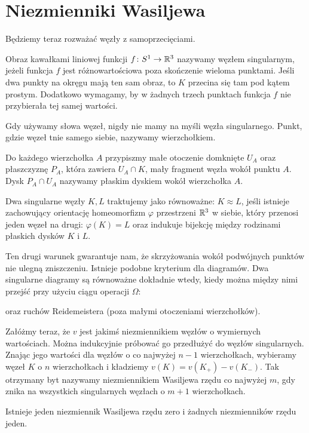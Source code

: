 \section{Niezmienniki Wasiljewa} %
\label{sec:vassiliev}
Będziemy teraz rozważać węzły z samoprzecięciami.

\begin{definition}
	Obraz kawałkami liniowej funkcji $f \colon S^1 \to \mathbb R^3$ nazywamy węzłem singularnym, jeżeli funkcja $f$ jest różnowartościowa poza skończenie wieloma punktami.
	Jeśli dwa punkty na okręgu mają ten sam obraz, to $K$ przecina się tam pod kątem prostym.
	Dodatkowo wymagamy, by w żadnych trzech punktach funkcja $f$ nie przybierała tej samej wartości.
\end{definition}

Gdy używamy słowa węzeł, nigdy nie mamy na myśli węzła singularnego.
Punkt, gdzie węzeł tnie samego siebie, nazywamy wierzchołkiem.

Do każdego wierzchołka $A$ przypiszmy małe otoczenie domknięte $U_A$ oraz płaszczyznę $P_A$, która zawiera $U_A \cap K$, mały fragment węzła wokół punktu $A$. Dysk $P_A \cap U_A$ nazywamy płaskim dyskiem wokół wierzchołka $A$.

\begin{definition}
	Dwa singularne węzły $K, L$ traktujemy jako równoważne: $K \approx L$, jeśli istnieje zachowujący orientację homeomorfizm $\varphi$ przestrzeni $\mathbb R^3$ w siebie, który przenosi jeden węzeł na drugi: $\varphi(K) = L$ oraz indukuje bijekcję między rodzinami płaskich dysków $K$ i $L$.
\end{definition}

Ten drugi warunek gwarantuje nam, że skrzyżowania wokół podwójnych punktów nie ulegną zniszczeniu.
Istnieje podobne kryterium dla diagramów.
Dwa singularne diagramy są równoważne dokładnie wtedy, kiedy można między nimi przejść przy użyciu ciągu operacji $\Omega$:

oraz ruchów Reidemeistera (poza małymi otoczeniami wierzchołków).

Załóżmy teraz, że $v$ jest jakimś niezmiennikiem węzłów o wymiernych wartościach.
Można indukcyjnie próbować go przedłużyć do węzłów singularnych.
Znając jego wartości dla węzłów o co najwyżej $n - 1$ wierzchołkach,  wybieramy węzeł $K$ o $n$ wierzchołkach i kładziemy $v(K) = v(K_+) - v(K_-)$.
Tak otrzymany byt nazywamy niezmiennikiem Wasiljewa rzędu co najwyżej $m$, gdy znika na wszystkich singularnych węzłach o $m + 1$ wierzchołkach.

Istnieje jeden niezmiennik Wasiljewa rzędu zero i żadnych niezmienników rzędu jeden.

